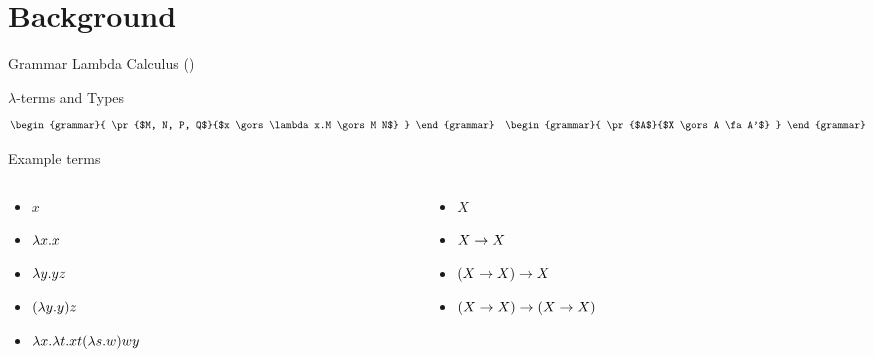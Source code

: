 \documentclass{beamer}
\theoremstyle{definition}
\begin{document}
  \section{Background}
  \begin{frame}{Grammar Lambda Calculus (\lc)}
    \begin{block}{\boldmath${\lambda}$-terms and Types}
      \vspace{7pt}
      \begin{align*}
        \begin{grammar}{
          \pr{$M, N, P, Q$}{$x \gors \lambda x.M \gors M N$}
        }
        \end{grammar}
        \quad 
        \begin{grammar}{
          \pr{$A$}{$X \gors A \fa A'$}
        }
        \end{grammar}
      \end{align*}
    \end{block} \pause
    \begin{block}{Example terms} \pause
      \begin{columns}
        \begin{column}{0.48\textwidth}
          \begin{itemize}
            \item $x$ \pause
            \item $\lambda {x}.{x}$ \pause
            \item $\lambda {y}.{y} z$ \pause
            \item $(\lambda {y}.{y}) z$ \pause
            \item $\lambda {x}.{\lambda {t}.{x t (\lambda {s}.{w})}wy}$
          \end{itemize}
        \end{column}
        \begin{column}{0.48\textwidth}
          \begin{itemize}
            \item $X$ \pause
            \item $X \to X$\pause
            \item $(X \to X) \to X$\pause
            \item $(X \to X) \to (X \to X)$
          \end{itemize}
        \end{column}
      \end{columns}
    \end{block}
  \end{frame}
\end{document}
